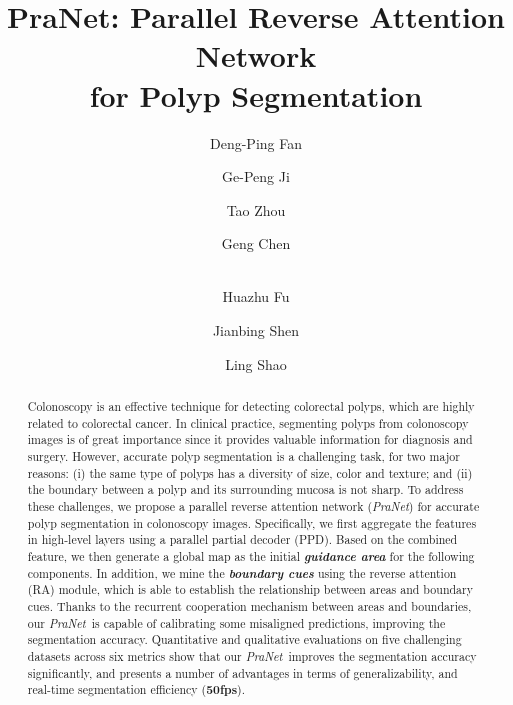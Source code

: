 \documentclass[runningheads]{llncs}
\def\ourmodel{\textit{PraNet}}
\begin{document}
\title{PraNet: Parallel Reverse Attention Network \\for Polyp Segmentation}



\author{Deng-Ping Fan \and
Ge-Peng Ji \and
Tao Zhou   \and 
Geng Chen  \and  \\
Huazhu Fu  \Envelope \and
Jianbing Shen \Envelope \and
Ling Shao          
}








\maketitle              \begin{abstract}
Colonoscopy is an effective technique for detecting colorectal polyps, which are highly related to colorectal cancer.
In clinical practice, segmenting polyps from colonoscopy images is of great importance since it provides valuable information for diagnosis and surgery.
However, accurate polyp segmentation is a challenging task, for two major reasons: (i) the same type of polyps has a diversity of size, color and texture; and (ii) the boundary between a polyp and its surrounding mucosa is not sharp. 
To address these challenges, we propose a parallel reverse attention network (\ourmodel) for accurate polyp segmentation in colonoscopy images.
Specifically, we first aggregate the features in high-level layers using a parallel partial decoder (PPD). Based on the combined feature, we then generate a global map as the initial \textit{\textbf{guidance area}} for the following components.
In addition, we mine the \textit{\textbf{boundary cues}} using the reverse attention (RA) module, which is able to establish the relationship between areas and boundary cues.
Thanks to the recurrent cooperation mechanism between areas and boundaries, our \ourmodel~is capable of calibrating some misaligned predictions, improving the segmentation accuracy.
Quantitative and qualitative evaluations on five challenging datasets across six metrics show that our \ourmodel~improves the segmentation accuracy significantly, and presents a number of advantages in terms of generalizability, and real-time segmentation efficiency (\textbf{50fps}). 


\end{abstract}
\end{document}
